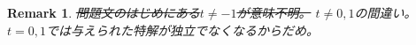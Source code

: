 \documentclass[fleqn]{jsarticle}
\newtheorem{remark}{Remark}
\begin{document}
\begin{comment}
\begin{remark}
よくある問題は特殊解を一つ与えた上で、
非同次方程式の一般解を求めさせる問題だが、
この問題は特殊解を(複数個)
先に与えている、という点において目新しい。
よくよく考えると、微分方程式を与えると、
(一般解に対応する)解空間を考えることができるが、
この問題は、解空間の中の有限個の点から解空間全体を復元できることも主張している。
線形空間であれば、次元の数のぶんだけ解を用意すればよいが、
今回は線形空間でもない、という点においても非常に面白い問題であると思う。
\end{remark}
\end{comment}

\begin{remark}
\sout{問題文のはじめにある$t\ne -1$が意味不明。}
$t\ne 0,1$の間違い。$t=0,1$では与えられた特解が独立でなくなるからだめ。
\end{remark}
\end{document}
